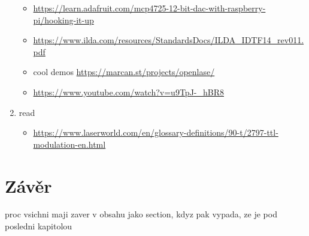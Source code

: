 \documentclass{template/socthesis}
\begin{document}
\begin{enumerate}
\begin{itemize}
          \item \url{https://learn.adafruit.com/mcp4725-12-bit-dac-with-raspberry-pi/hooking-it-up}
          \item \url{https://www.ilda.com/resources/StandardsDocs/ILDA_IDTF14_rev011.pdf}
          \item cool demos \url{https://marcan.st/projects/openlase/}
          \item \url{https://www.youtube.com/watch?v=u9TpJ-_hBR8}
        \end{itemize}
  \item read
        \begin{itemize}
          \item \url{https://www.laserworld.com/en/glossary-definitions/90-t/2797-ttl-modulation-en.html}
        \end{itemize}

\end{enumerate}

\newpage
\chapter*{Závěr}
proc vsichni maji zaver v obsahu jako section, kdyz pak vypada, ze je pod posledni kapitolou

\newpage
\printbibliography[title=Literatura]

\listoffigures
{}

\listoftables
{}
%
\end{document}
